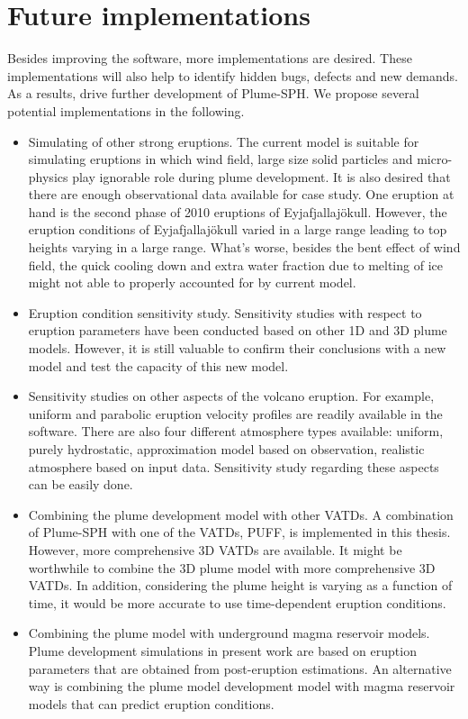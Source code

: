 \section{Future implementations}
Besides improving the software, more implementations are desired. These implementations will also help to identify hidden bugs, defects and new demands. As a results, drive further development of Plume-SPH.
We propose several potential implementations in the following.
\begin{itemize}
\item Simulating of other strong eruptions. The current model is suitable for simulating eruptions in which wind field, large size solid particles and micro-physics play ignorable role during plume development. It is also desired that there are enough observational data available for case study. One eruption at hand is the second phase of 2010 eruptions of Eyjafjallajökull. However, the eruption conditions of Eyjafjallajökull varied in a large range leading to top heights varying in a large range. What's worse, besides the bent effect of wind field, the quick cooling down and extra water fraction due to melting of ice might not able to properly accounted for by current model.
\item Eruption condition sensitivity study. Sensitivity studies with respect to eruption parameters have been conducted based on other 1D and 3D plume models. However, it is still valuable to confirm their conclusions with a new model and test the capacity of this new model.
\item Sensitivity studies on other aspects of the volcano eruption. For example, uniform and parabolic eruption velocity profiles are readily available in the software. There are also four different atmosphere types available: uniform, purely hydrostatic, approximation model based on observation, realistic atmosphere based on input data. Sensitivity study regarding these aspects can be easily done.
\item Combining the plume development model with other VATDs. A combination of Plume-SPH with one of the VATDs, PUFF, is implemented in this thesis. However, more comprehensive 3D VATDs are available. It might be worthwhile to combine the 3D plume model with more comprehensive 3D VATDs. In addition, considering the plume height is varying as a function of time, it would be more accurate to use time-dependent eruption conditions.
\item Combining the plume model with underground magma reservoir models. Plume development simulations in present work are based on eruption parameters that are obtained from post-eruption estimations. An alternative way is combining the plume model development model with magma reservoir models that can predict eruption conditions.

\end{itemize}

